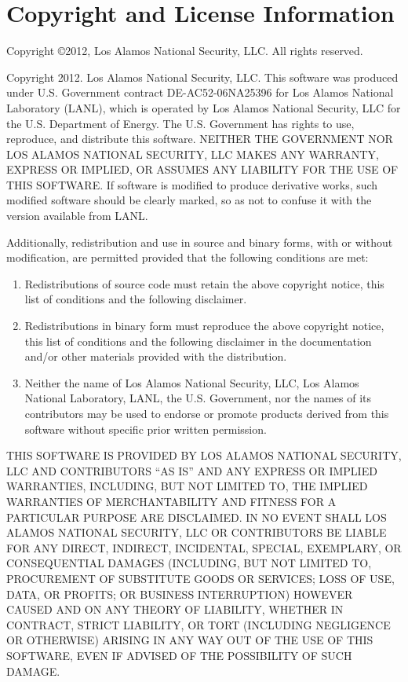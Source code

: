 \documentclass[11pt,letterpaper]{article} %
\begin{document}
\section{Copyright and License Information}

Copyright \copyright 2012, Los Alamos National Security, LLC.
All rights reserved.

Copyright 2012. Los Alamos National Security, LLC.
This software was produced under U.S. Government contract
DE-AC52-06NA25396 for Los Alamos National Laboratory (LANL), which is
operated by Los Alamos National Security, LLC for the U.S. Department
of Energy. The U.S. Government has rights to use, reproduce, and
distribute this software. NEITHER THE GOVERNMENT NOR LOS ALAMOS
NATIONAL SECURITY, LLC MAKES ANY WARRANTY, EXPRESS OR IMPLIED, OR
ASSUMES ANY LIABILITY FOR THE USE OF THIS SOFTWARE. If software is
modified to produce derivative works, such modified software should be
clearly marked, so as not to confuse it with the version available from
LANL.

Additionally, redistribution and use in source and binary forms, with
or without modification, are permitted provided that the following
conditions are met:

\begin{enumerate}
\item Redistributions of source code must retain the above copyright
   notice, this list of conditions and the following disclaimer.
\item Redistributions in binary form must reproduce the above
   copyright notice, this list of conditions and the following
   disclaimer in the documentation and/or other materials provided
   with the distribution.
\item Neither the name of Los Alamos National Security, LLC, Los Alamos
   National Laboratory, LANL, the U.S. Government, nor the names of its
   contributors may be used to endorse or promote products derived from
   this software without specific prior written permission.
\end{enumerate}

THIS SOFTWARE IS PROVIDED BY LOS ALAMOS NATIONAL SECURITY, LLC AND
CONTRIBUTORS ``AS IS'' AND ANY EXPRESS OR IMPLIED WARRANTIES, INCLUDING,
BUT NOT LIMITED TO, THE IMPLIED WARRANTIES OF MERCHANTABILITY AND FITNESS
FOR A PARTICULAR PURPOSE ARE DISCLAIMED. IN NO EVENT SHALL LOS ALAMOS
NATIONAL SECURITY, LLC OR CONTRIBUTORS BE LIABLE FOR ANY DIRECT,
INDIRECT, INCIDENTAL, SPECIAL, EXEMPLARY, OR CONSEQUENTIAL DAMAGES
(INCLUDING, BUT NOT LIMITED TO, PROCUREMENT OF SUBSTITUTE GOODS OR
SERVICES; LOSS OF USE, DATA, OR PROFITS; OR BUSINESS INTERRUPTION)
HOWEVER CAUSED AND ON ANY THEORY OF LIABILITY, WHETHER IN CONTRACT,
STRICT LIABILITY, OR TORT (INCLUDING NEGLIGENCE OR OTHERWISE) ARISING
IN ANY WAY OUT OF THE USE OF THIS SOFTWARE, EVEN IF ADVISED OF THE
POSSIBILITY OF SUCH DAMAGE.
\end{document}
